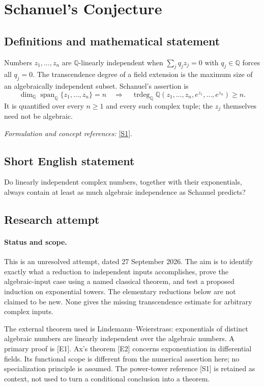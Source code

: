 \documentclass[11pt]{article}
\begin{document}
\section*{\texorpdfstring{Schanuel's Conjecture}{Schanuel's Conjecture}}\label{statement}
\subsection{Definitions and mathematical statement}
Numbers $z_1,\ldots,z_n$ are ${\mathbb{Q}}$-linearly independent when $\sum_jq_jz_j=0$ with $q_j\in{\mathbb{Q}}$ forces all $q_j=0$. The transcendence degree of a field extension is the maximum size of an algebraically independent subset. Schanuel's assertion is
\[
 \dim_{{\mathbb{Q}}}\operatorname{span}_{{\mathbb{Q}}}\{z_1,\ldots,z_n\}=n
 \quad\Longrightarrow\quad
 \operatorname{trdeg}_{{\mathbb{Q}}}{\mathbb{Q}}(z_1,\ldots,z_n,e^{z_1},\ldots,e^{z_n})\ge n.
\]
It is quantified over every $n\ge1$ and every such complex tuple; the $z_j$ themselves need not be algebraic.
\par\smallskip\textit{Formulation and concept references:} \href{https://www.mdpi.com/2227-7390/9/7/717}{[S1]}.

\subsection{Short English statement}
Do linearly independent complex numbers, together with their exponentials, always contain at least as much algebraic independence as Schanuel predicts?
\subsection{Research attempt}
\paragraph{Status and scope.}
This is an unresolved attempt, dated 27 September 2026. The aim is to
identify exactly what a reduction to independent inputs accomplishes, prove
the algebraic-input case using a named classical theorem, and test a proposed
induction on exponential towers. The elementary reductions below are not
claimed to be new. None gives the missing transcendence estimate for arbitrary
complex inputs.

The external theorem used is Lindemann--Weierstrass: exponentials of distinct
algebraic numbers are linearly independent over the algebraic numbers. A
primary proof is [E1]. Ax's theorem [E2] concerns exponentiation in differential
fields. Its functional scope is different from the numerical assertion here;
no specialization principle is assumed. The power-tower reference [S1] is
retained as context, not used to turn a conditional conclusion into a theorem.
\end{document}
